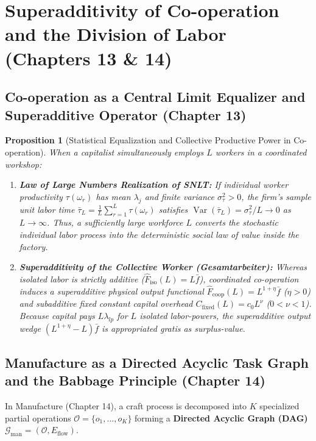 \documentclass[11pt,a4paper]{article}
\newtheorem{proposition}{Proposition}[section]
\begin{document}
\section{Superadditivity of Co-operation and the Division of Labor (Chapters 13 \& 14)}

\subsection{Co-operation as a Central Limit Equalizer and Superadditive Operator (Chapter 13)}

\begin{proposition}[Statistical Equalization and Collective Productive Power in Co-operation]
When a capitalist simultaneously employs $L$ workers in a coordinated workshop:
\begin{enumerate}[label=(\roman*)]
    \item \textbf{Law of Large Numbers Realization of SNLT:} If individual worker productivity $\tau(\omega_r)$ has mean $\lambda_j$ and finite variance $\sigma_\tau^2 > 0$, the firm's sample unit labor time $\bar{\tau}_L = \frac{1}{L}\sum_{r=1}^L \tau(\omega_r)$ satisfies $\operatorname{Var}(\bar{\tau}_L) = \sigma_\tau^2 / L \to 0$ as $L \to \infty$. Thus, a sufficiently large workforce $L$ converts the stochastic individual labor process into the deterministic social law of value inside the factory.
    \item \textbf{Superadditivity of the Collective Worker (\textit{Gesamtarbeiter}):} Whereas isolated labor is strictly additive ($\hat{F}_{\text{iso}}(L) = L \bar{f}$), coordinated co-operation induces a superadditive physical output functional $\hat{F}_{\text{coop}}(L) = L^{1+\eta} \bar{f}$ ($\eta > 0$) and subadditive fixed constant capital overhead $C_{\text{fixed}}(L) = c_0 L^\nu$ ($0 < \nu < 1$). Because capital pays $L \lambda_{lp}$ for $L$ isolated labor-powers, the superadditive output wedge $(L^{1+\eta} - L)\bar{f}$ is appropriated gratis as surplus-value.
\end{enumerate}
\end{proposition}

\subsection{Manufacture as a Directed Acyclic Task Graph and the Babbage Principle (Chapter 14)}

In Manufacture (Chapter 14), a craft process is decomposed into $K$ specialized partial operations $\mathcal{O} = \{o_1, \dots, o_K\}$ forming a \textbf{Directed Acyclic Graph (DAG)} $\mathcal{G}_{\text{man}} = (\mathcal{O}, E_{\text{flow}})$.
\end{document}
